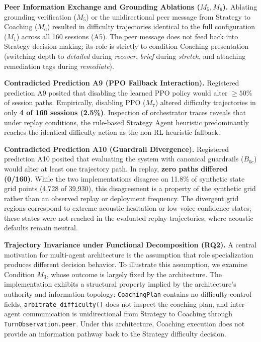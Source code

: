 \noindent\textbf{Peer Information Exchange and Grounding Ablations ($M_5, M_6$).} Ablating grounding verification ($M_5$) or the unidirectional peer message from Strategy to Coaching ($M_6$) resulted in difficulty trajectories identical to the full configuration ($M_1$) across all 160 sessions (A5). The peer message does not feed back into Strategy decision-making; its role is strictly to condition Coaching presentation (switching depth to \emph{detailed} during \emph{recover}, \emph{brief} during \emph{stretch}, and attaching remediation tags during \emph{remediate}).

\noindent\textbf{Contradicted Prediction A9 (PPO Fallback Interaction).} Registered prediction A9 posited that disabling the learned PPO policy would alter $\ge 50\%$ of session paths. Empirically, disabling PPO ($M_7$) altered difficulty trajectories in only \textbf{4 of 160 sessions (2.5\%)}. Inspection of orchestrator traces reveals that under replay conditions, the rule-based Strategy Agent heuristic predominantly reaches the identical difficulty action as the non-RL heuristic fallback.

\noindent\textbf{Contradicted Prediction A10 (Guardrail Divergence).} Registered prediction A10 posited that evaluating the system with canonical guardrails ($B_{0c}$) would alter at least one trajectory path. In replay, \textbf{zero paths differed (0/160)}. While the two implementations disagree on 11.8\% of synthetic state grid points (4,728 of 39,930), this disagreement is a property of the synthetic grid rather than an observed replay or deployment frequency. The divergent grid regions correspond to extreme acoustic hesitation or low voice-confidence states; these states were not reached in the evaluated replay trajectories, where acoustic defaults remain neutral.

\noindent\textbf{Trajectory Invariance under Functional Decomposition (RQ2).} A central motivation for multi-agent architecture is the assumption that role specialization produces different decision behavior. To illustrate this assumption, we examine Condition $M_3$, whose outcome is largely fixed by the architecture. The implementation exhibits a structural property implied by the architecture's authority and information topology: \texttt{CoachingPlan} contains no difficulty-control fields, \texttt{arbitrate\_difficulty()} does not inspect the coaching plan, and inter-agent communication is unidirectional from Strategy to Coaching through \texttt{TurnObservation.peer}. Under this architecture, Coaching execution does not provide an information pathway back to the Strategy difficulty decision.

